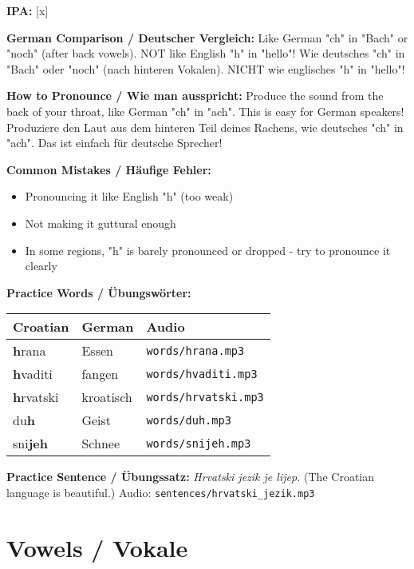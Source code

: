 \begin{tcolorbox}[colback=lightyellow!30, colframe=orange, title=\textbf{H, h}]

\textbf{IPA:} [x]

\textbf{German Comparison / Deutscher Vergleich:}
Like German "ch" in "Bach" or "noch" (after back vowels). NOT like English "h" in "hello"!
Wie deutsches "ch" in "Bach" oder "noch" (nach hinteren Vokalen). NICHT wie englisches "h" in "hello"!

\textbf{How to Pronounce / Wie man ausspricht:}
Produce the sound from the back of your throat, like German "ch" in "ach". This is easy for German speakers!
Produziere den Laut aus dem hinteren Teil deines Rachens, wie deutsches "ch" in "ach". Das ist einfach für deutsche Sprecher!

\textbf{Common Mistakes / Häufige Fehler:}
\begin{itemize}
    \item Pronouncing it like English "h" (too weak)
    \item Not making it guttural enough
    \item In some regions, "h" is barely pronounced or dropped - try to pronounce it clearly
\end{itemize}

\textbf{Practice Words / Übungswörter:}
\begin{tabular}{lll}
\textbf{Croatian} & \textbf{German} & \textbf{Audio} \\
\midrule
\textbf{h}rana & Essen & \texttt{words/hrana.mp3} \\
\textbf{h}vaditi & fangen & \texttt{words/hvaditi.mp3} \\
\textbf{h}rvatski & kroatisch & \texttt{words/hrvatski.mp3} \\
du\textbf{h} & Geist & \texttt{words/duh.mp3} \\
sni\textbf{jeh} & Schnee & \texttt{words/snijeh.mp3} \\
\end{tabular}

\textbf{Practice Sentence / Übungssatz:}
\textit{Hrvatski jezik je lijep.}
(The Croatian language is beautiful.)
Audio: \texttt{sentences/hrvatski\_jezik.mp3}

\end{tcolorbox}

\section{Vowels / Vokale}

